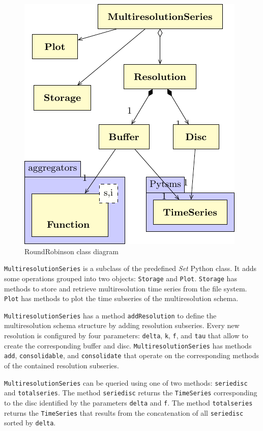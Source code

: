 \begin{figure}[tp]
  \centering
  \includegraphics{fig_roundrobinson_uml.pdf}
  \caption{RoundRobinson  class diagram}
  \label{fig:implementacio:roundrobinson-uml}
\end{figure}

\texttt{MultiresolutionSeries} is a subclass of the predefined
\emph{Set} Python class. It adds some operations grouped into two
objects: \texttt{Storage} and \texttt{Plot}. \texttt{Storage} has
methods to store and retrieve multiresolution time series from the
file system. \texttt{Plot} has methods to plot the time subseries of
the multiresolution schema.

\texttt{MultiresolutionSeries} has a method \texttt{addResolution} to
define the multiresolution schema structure by adding resolution
subseries. Every new resolution is configured by four parameters:
\texttt{delta}, \texttt{k}, \texttt{f}, and \texttt{tau} that allow to
create the corresponding buffer and disc.
\texttt{MultiresolutionSeries} has methods \texttt{add},
\texttt{consolidable}, and \texttt{consolidate} that operate on the
corresponding methods of the contained resolution subseries.

\texttt{MultiresolutionSeries} can be queried using one of two
methods: \texttt{seriedisc} and \texttt{totalseries}. The method
\texttt{seriedisc} returns the \texttt{TimeSeries} corresponding to
the disc identified by the parameters \texttt{delta} and
\texttt{f}. The method \texttt{totalseries} returns the \texttt{TimeSeries} that
results from the concatenation of all \texttt{seriedisc} sorted by
\texttt{delta}.

